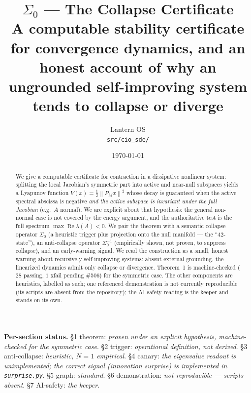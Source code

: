 \documentclass[11pt]{article}
\title{\textbf{$\Sigma_0$ --- The Collapse Certificate}\\[4pt]
\large A computable stability certificate for convergence dynamics, and an honest
account of why an ungrounded self-improving system tends to collapse or diverge}
\author{Lantern OS \\ \texttt{src/cio\_sde/}}
\date{\today}
\theoremstyle{definition}
\newcommand{\norm}[1]{\left\lVert#1\right\rVert}
\newcommand{\Szero}{\Sigma_0}
\newcommand{\PM}{P_{\!M}}
\DeclareMathOperator*{\Real}{Re}
\begin{document}
\maketitle

\begin{abstract}
We give a computable certificate for contraction in a dissipative nonlinear
system: splitting the local Jacobian's symmetric part into active and near-null
subspaces yields a Lyapunov function $V(x)=\tfrac12\norm{\PM x}^2$ whose decay is
guaranteed when the active spectral abscissa is negative \emph{and the active
subspace is invariant under the full Jacobian} (e.g.\ $A$ normal). We are explicit
about that hypothesis: the general non-normal case is not covered by the energy
argument, and the authoritative test is the full spectrum $\max\Real\lambda(A)<0$.
We pair the theorem with a semantic collapse operator $\Szero$ (a heuristic
trigger plus projection onto the null manifold --- the ``42-state''), an
anti-collapse operator $\Sigma_0^{-1}$ (empirically shown, not proven, to suppress
collapse), and an early-warning signal. We read the construction as a small, honest
warning about recursively self-improving systems: absent external grounding, the
linearized dynamics admit only collapse or divergence. Theorem~1 is machine-checked
($28$ passing, $1$ xfail pending \#506) for the symmetric case. The other components are heuristics,
labelled as such; one referenced demonstration is not currently reproducible (its
scripts are absent from the repository); the AI-safety reading is the keeper and
stands on its own.
\end{abstract}

\begin{caveatbox}
\textbf{Per-section status.} \S1 theorem: \emph{proven under an explicit hypothesis,
machine-checked for the symmetric case}. \S2 trigger: \emph{operational definition,
not derived}. \S3 anti-collapse: \emph{heuristic, $N{=}1$ empirical}. \S4 canary:
\emph{the eigenvalue readout is unimplemented; the correct signal (innovation
surprise) is implemented in \texttt{surprise.py}}. \S5 graph: \emph{standard}.
\S6 demonstration: \emph{not reproducible --- scripts absent}. \S7 AI-safety:
\emph{the keeper}.
\end{caveatbox}

\tableofcontents
\bigskip

\end{document}
